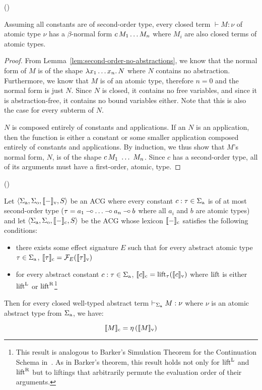 \begin{corollary}\label{cor:second-order-trees}
  ()
  
  Assuming all constants are of second-order type, every closed term
  $\vdash M : \nu$ of atomic type $\nu$ has a $\beta$-normal form
  $c\,M_1 \ldots M_n$ where $M_i$ are also closed terms of atomic
  types.
\end{corollary}

\begin{proof}
  From Lemma~\ref{lem:second-order-no-abstractions}, we know that the
  normal form of $M$ is of the shape $\lambda x_1 \ldots x_n.\, N$ where $N$
  contains no abstraction. Furthermore, we know that $M$ is of an atomic
  type, therefore $n = 0$ and the normal form is just $N$. Since $N$ is
  closed, it contains no free variables, and since it is abstraction-free,
  it contains no bound variables either. Note that this is also the case
  for every subterm of $N$.
  
  $N$ is composed entirely of constants and applications. If an $N$ is an
  application, then the function is either a constant or some smaller
  application composed entirely of constants and applications. By
  induction, we thus show that $M$'s normal form, $N$, is of the shape
  $\ap{c}{M_1\ \ldots\ M_n}$. Since $c$ has a second-order type, all of its
  arguments must have a first-order, atomic, type.
\end{proof}

\begin{observation}
  ()
  
  Let $\left< \Sigma_{\mathrm{a}}, \Sigma_{\mathrm{o}}, \llbracket - \rrbracket_{\mathrm{v}}, S \right>$
  be an ACG where every constant $c : \tau \in \Sigma_{\mathrm{a}}$ is of at
  most second-order type ($\tau = a_1 \mathbin{{-}\mkern-3.5mu{\circ}} \ldots \mathbin{{-}\mkern-3.5mu{\circ}} a_n \mathbin{{-}\mkern-3.5mu{\circ}} b$ where
  all $a_i$ and $b$ are atomic types) and let
  $\left< \Sigma_{\mathrm{a}}, \Sigma_{\mathrm{o}}, \llbracket - \rrbracket_{\mathrm{c}}, S \right>$ be
  the ACG whose lexicon $\llbracket - \rrbracket_{\mathrm{c}}$ satisfies the following
  conditions:

  \begin{itemize}
  \item there exists some effect signature $E$ such that for every abstract
    atomic type $\tau \in \Sigma_{\mathrm{a}}$,
    $\llbracket \tau \rrbracket_{\mathrm{c}} = \mathcal{F}_E(\llbracket \tau \rrbracket_{\mathrm{v}})$
  \item for every abstract constant $c : \tau \in \Sigma_{\mathrm{a}}$,
    $\llbracket c \rrbracket_{\mathrm{c}} = \operatorname{lift}_\tau(\llbracket c \rrbracket_{\mathrm{v}})$ where $\operatorname{lift}$ is either
    $\operatorname{lift}^{\mathrm{L}}$ or $\operatorname{lift}^{\mathrm{R}}$\footnote{This result is analogous to Barker's
      Simulation Theorem for the Continuation Schema
      in~\cite{barker2002continuations}. As in Barker's theorem, this
      result holds not only for $\operatorname{lift}^{\mathrm{L}}$ and $\operatorname{lift}^{\mathrm{R}}$ but to liftings that
      arbitrarily permute the evaluation order of their arguments.}
  \end{itemize}
  
  Then for every closed well-typed abstract term
  $\vdash_{\Sigma_{\mathrm{a}}} M : \nu$ where $\nu$ is an atomic abstract type
  from $\Sigma_{\mathrm{a}}$, we have:

  $$
  \llbracket M \rrbracket_{\mathrm{c}} = \eta\,(\llbracket M \rrbracket_{\mathrm{v}})
  $$
\end{observation}

